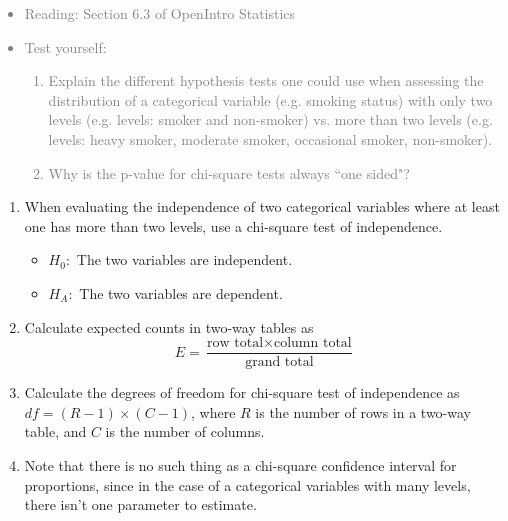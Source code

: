 \documentclass[11pt]{article}
\newcommand{\gray}[1]{\textcolor{gray}{#1}}
\begin{document}
\gray{
{\it
\vspace{-0.55cm}
\begin{itemize}
\renewcommand{\labelitemi}{{\textcolor{dark}{$\ast$}}}
\item Reading: Section 6.3 of OpenIntro Statistics
\item Test yourself:
\begin{enumerate}
\item Explain the different hypothesis tests one could use when assessing the distribution of a categorical variable (e.g. smoking status) with only two levels (e.g. levels: smoker and non-smoker) vs. more than two levels (e.g. levels: heavy smoker, moderate smoker, occasional smoker, non-smoker).
\item Why is the p-value for chi-square tests always ``one sided"?
\end{enumerate}
\end{itemize}
}}

%

\begin{enumerate}[resume]
\renewcommand\labelenumi{\textcolor{light}{\textbf{LO \theenumi.}}}

\item When evaluating the independence of two categorical variables where at least one has more than two levels, use a chi-square test of independence.
\begin{itemize}
\item[] $H_0:$ The two variables are independent.
\item[] $H_A:$ The two variables are dependent.
\end{itemize}

\item Calculate expected counts in two-way tables as 
\[ E = \frac{\text{row total} \times \text{column total}}{\text{grand total}} \]

\item Calculate the degrees of freedom for chi-square test of independence as $df = (R - 1) \times (C - 1)$, where $R$ is the number of rows in a two-way table, and $C$ is the number of columns.

\item Note that there is no such thing as a chi-square confidence interval for proportions, since in the case of a categorical variables with many levels, there isn't one parameter to estimate.

\end{enumerate}
\end{document}
